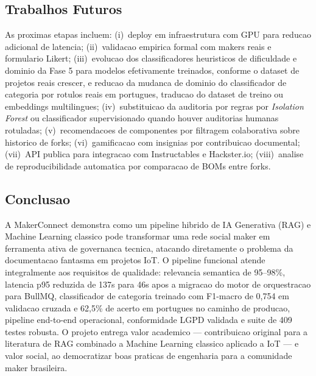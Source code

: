 \documentclass[portuguese]{sbcreviews-2025}%
\begin{document}
\subsection{Trabalhos Futuros}

As proximas etapas incluem: (i)~deploy em infraestrutura com GPU para reducao adicional de latencia; (ii)~validacao empirica formal com makers reais e formulario Likert; (iii)~evolucao dos classificadores heuristicos de dificuldade e dominio da Fase 5 para modelos efetivamente treinados, conforme o dataset de projetos reais crescer, e reducao da mudanca de dominio do classificador de categoria por rotulos reais em portugues, traducao do dataset de treino ou embeddings multilingues; (iv)~substituicao da auditoria por regras por \textit{Isolation Forest} ou classificador supervisionado quando houver auditorias humanas rotuladas; (v)~recomendacoes de componentes por filtragem colaborativa sobre historico de forks; (vi)~gamificacao com insignias por contribuicao documental; (vii)~API publica para integracao com Instructables e Hackster.io; (viii)~analise de reproducibilidade automatica por comparacao de BOMs entre forks.

\subsection{Conclusao}

A MakerConnect demonstra como um pipeline hibrido de IA Generativa (RAG) e Machine Learning classico pode transformar uma rede social maker em ferramenta ativa de governanca tecnica, atacando diretamente o problema da documentacao fantasma em projetos IoT. O pipeline funcional atende integralmente aos requisitos de qualidade: relevancia semantica de 95--98\%, latencia p95 reduzida de 137s para 46s apos a migracao do motor de orquestracao para BullMQ, classificador de categoria treinado com F1-macro de 0,754 em validacao cruzada e 62,5\% de acerto em portugues no caminho de producao, pipeline end-to-end operacional, conformidade LGPD validada e suite de 409 testes robusta. O projeto entrega valor academico --- contribuicao original para a literatura de RAG combinado a Machine Learning classico aplicado a IoT --- e valor social, ao democratizar boas praticas de engenharia para a comunidade maker brasileira.
\end{document}
